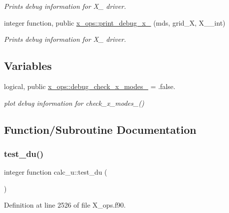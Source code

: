 \begin{DoxyCompactItemize}
\begin{DoxyCompactList}\small\item\em Prints debug information for X\+\_ driver. \end{DoxyCompactList}\item 
integer function, public \hyperlink{namespacex__ops_a8879ea26ad86818e981546c3ab2d6165}{x\+\_\+ops\+::print\+\_\+debug\+\_\+x\+\_} (mds, grid\+\_\+X, X\+\_\+\_\+int)
\begin{DoxyCompactList}\small\item\em Prints debug information for X\+\_ driver. \end{DoxyCompactList}\end{DoxyCompactItemize}
\subsection*{Variables}
\begin{DoxyCompactItemize}
\item 
logical, public \hyperlink{namespacex__ops_a342c624ea5f9a15264c78767da34684c}{x\+\_\+ops\+::debug\+\_\+check\+\_\+x\+\_\+modes\+\_} = .false.
\begin{DoxyCompactList}\small\item\em plot debug information for check\+\_\+x\+\_\+modes\+\_() \end{DoxyCompactList}\end{DoxyCompactItemize}


\subsection{Function/\+Subroutine Documentation}
\mbox{\label{X__ops_8f90_a60ad682c469a085ff3f744ce3191940f}} 
\subsubsection{\texorpdfstring{test\+\_\+du()}{test\_du()}}
{\footnotesize\ttfamily integer function calc\+\_\+u\+::test\+\_\+du (\begin{DoxyParamCaption}{ }\end{DoxyParamCaption})}



Definition at line 2526 of file X\+\_\+ops.\+f90.

